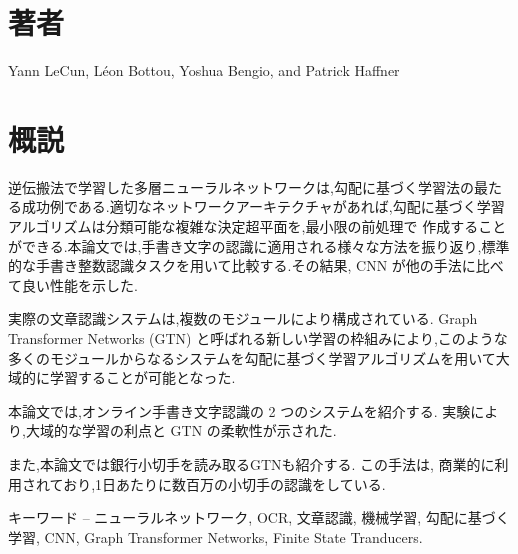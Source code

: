 \documentclass[twocolumn]{jarticle}     %
\begin{document}

\section*{著者}
Yann LeCun, L\'{e}on Bottou, Yoshua Bengio, and Patrick Haffner \cite{thispaper}

\section*{概説}
逆伝搬法で学習した多層ニューラルネットワークは,勾配に基づく学習法の最たる成功例である.適切なネットワークアーキテクチャがあれば,勾配に基づく学習アルゴリズムは分類可能な複雑な決定超平面を,最小限の前処理で 作成することができる.本論文では,手書き文字の認識に適用される様々な方法を振り返り,標準的な手書き整数認識タスクを用いて比較する.その結果, CNN が他の手法に比べて良い性能を示した.
\par
実際の文章認識システムは,複数のモジュールにより構成されている. Graph Transformer Networks (GTN) と呼ばれる新しい学習の枠組みにより,このような多くのモジュールからなるシステムを勾配に基づく学習アルゴリズムを用いて大域的に学習することが可能となった.
\par
本論文では,オンライン手書き文字認識の 2 つのシステムを紹介する.
実験により,大域的な学習の利点と GTN の柔軟性が示された.
\par
また,本論文では銀行小切手を読み取るGTNも紹介する. この手法は, 
商業的に利用されており,1日あたりに数百万の小切手の認識をしている.
\par
キーワード -- ニューラルネットワーク, OCR, 文章認識, 機械学習, 勾配に基づく学習, CNN, Graph Transformer Networks, Finite State Tranducers.
\end{document}
